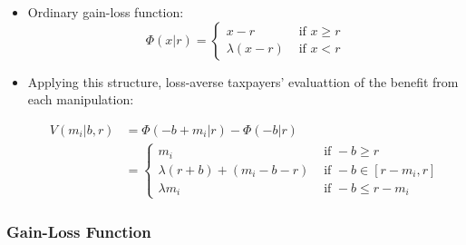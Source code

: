 \documentclass[dvipdfmx,12pt]{beamer}
\begin{document}
\begin{frame}
  \begin{itemize}
    \item Ordinary gain-loss function:
    \[
    \Phi(x|r) = \begin{cases}
    x-r & \text{ if } x \geq r \\
    \lambda (x-r) & \text{ if } x < r
  \end{cases}
  \]

    \item Applying this structure, loss-averse taxpayers' evaluattion
    of the benefit from each manipulation:

    \begin{align*}
      V(m_i | b, r) &= \Phi(-b + m_i | r) - \Phi(-b | r) \\
       &= \begin{cases}
       m_i & \text{ if } -b \geq r \\
       \lambda(r+b)+(m_i -b -r) & \text{ if } -b \in [r-m_i, r] \\
       \lambda m_i & \text{ if } -b \leq r - m_i
       \end{cases}
    \end{align*}
  \end{itemize}
\end{frame}

\begin{frame}\frametitle{Gain-Loss Function}
\end{frame}
\end{document}
